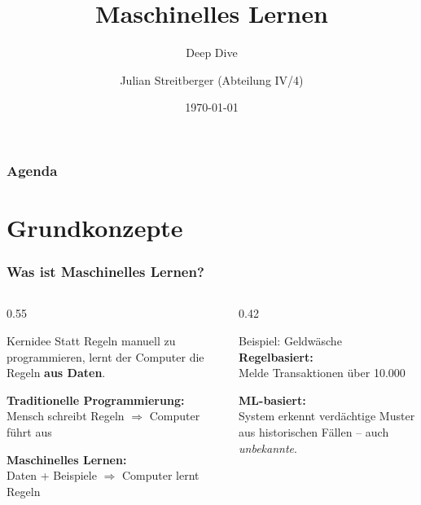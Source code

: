 \documentclass[11pt, aspectratio=169]{beamer}
\title{Maschinelles Lernen}
\subtitle{Deep Dive}
\author{Julian Streitberger (Abteilung IV/4)}
\date{\today}
\begin{document}
\maketitle

\begin{frame}
    \frametitle{Agenda}
    \tableofcontents
\end{frame}

\section{Grundkonzepte}

\begin{frame}
    \frametitle{Was ist Maschinelles Lernen?}
    \begin{columns}[t]
        \begin{column}{0.55\textwidth}
            \begin{block}{Kernidee}
                Statt Regeln manuell zu programmieren, lernt der Computer die Regeln \textbf{aus Daten}.
            \end{block}
            \vspace{0.4cm}
            \textbf{Traditionelle Programmierung:}\\
            Mensch schreibt Regeln $\Rightarrow$ Computer führt aus
            \vspace{0.3cm}
            
            \textbf{Maschinelles Lernen:}\\
            Daten + Beispiele $\Rightarrow$ Computer lernt Regeln
        \end{column}
        \begin{column}{0.42\textwidth}
            \begin{exampleblock}{Beispiel: Geldwäsche}
                \textbf{Regelbasiert:}\\
                \glqq Melde Transaktionen über 10.000 \texteuro\grqq
                \vspace{0.2cm}
                
                \textbf{ML-basiert:}\\
                System erkennt verdächtige Muster aus historischen Fällen -- auch \textit{unbekannte}.
            \end{exampleblock}
        \end{column}
    \end{columns}
\end{frame}
\end{document}
